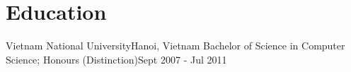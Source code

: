 \section{Education}
  \resumeSubHeadingListStart
    \resumeSubheading
      {Vietnam National University}{Hanoi, Vietnam}
      {Bachelor of Science in Computer Science;  Honours (Distinction)}{Sept 2007 - Jul 2011}
  \resumeSubHeadingListEnd